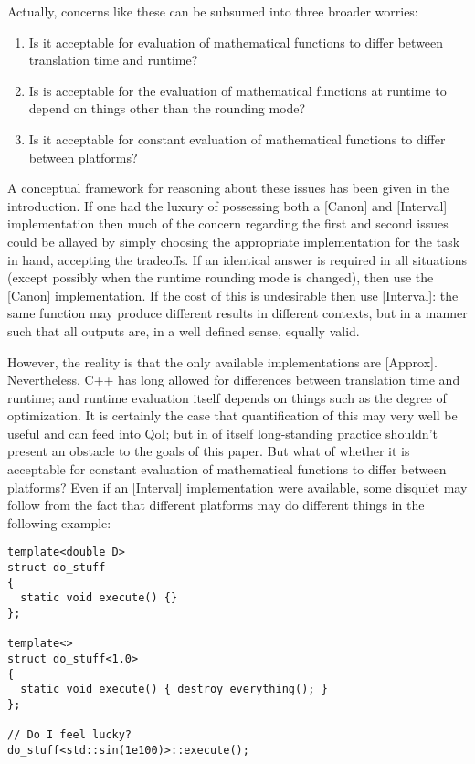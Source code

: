 \documentclass[prd,twocolumn,amsmath,amssymb,nofootinbib,eqsecnum]{revtex4-1}
\begin{document}
Actually, concerns like these can be subsumed into three broader worries:
\begin{enumerate}
	\item Is it acceptable for evaluation of mathematical functions to differ between translation time and
	runtime?
	
	\item Is is acceptable for the evaluation of mathematical functions at runtime to depend on things other than the rounding mode?

	\item Is it acceptable for constant evaluation of mathematical functions to differ between platforms?
\end{enumerate}

A conceptual framework for reasoning about these issues has been given in the introduction. If one had the luxury of possessing both a [Canon] and [Interval] implementation then much of the concern regarding the first and second issues could be allayed by simply choosing the appropriate implementation for the task in hand, accepting the tradeoffs. If an identical answer is required in all situations (except possibly when the runtime rounding mode is changed), then use the [Canon] implementation. If the cost of this is undesirable then use [Interval]: the same function may produce different results in different contexts, but in a manner such that all outputs are, in a well defined sense, equally valid.

However, the reality is that the only available implementations are [Approx]. Nevertheless, C++ has long allowed for differences between translation time and runtime; and runtime evaluation itself depends on things such as the degree of optimization. It is certainly the case that quantification of this may very well be useful and can feed into QoI; but in of itself long-standing practice shouldn't present an obstacle to the goals of this paper. But what of whether it is acceptable for constant evaluation of mathematical functions to differ between platforms? Even if an [Interval] implementation were available, some disquiet may follow from the fact that different platforms may do different things in the following example:
\begin{verbatim}
template<double D>
struct do_stuff
{
  static void execute() {}
};

template<>
struct do_stuff<1.0>
{
  static void execute() { destroy_everything(); }
};

// Do I feel lucky?
do_stuff<std::sin(1e100)>::execute();
\end{verbatim}
\end{document}
